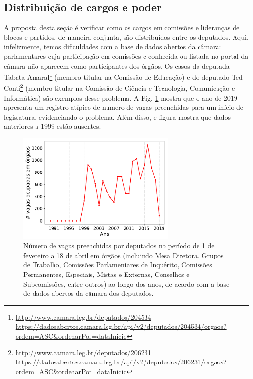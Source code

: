 \documentclass[12pt,a4paper]{article}
\newcommand{\footurl}[1]{{\scriptsize\url{#1}}}
\begin{document}
\subsection{Distribuição de cargos e poder}
\label{sec:cargos-deputados}

A proposta desta seção é verificar como os cargos em comissões e lideranças de blocos e partidos,
de maneira conjunta, são distribuídos entre os deputados. Aqui, infelizmente, temos dificuldades com a base de dados
abertos da câmara: parlamentares cuja participação em comissões é conhecida ou listada no portal
da câmara não aparecem como participantes dos órgãos. Os casos da deputada Tabata
Amaral\footnote{\footurl{http://www.camara.leg.br/deputados/204534}\\
  \footurl{https://dadosabertos.camara.leg.br/api/v2/deputados/204534/orgaos?ordem=ASC\&ordenarPor=dataInicio}}
(membro titular na Comissão de Educação) e do deputado
Ted Conti\footnote{\footurl{http://www.camara.leg.br/deputados/206231}\\
  \footurl{https://dadosabertos.camara.leg.br/api/v2/deputados/206231/orgaos?ordem=ASC\&ordenarPor=dataInicio}}
(membro titular na Comissão de Ciência e Tecnologia, Comunicação e Informática) são exemplos desse
problema. A Fig. \ref{fig:orgaos-por-ano} mostra que o ano de 2019 apresenta um registro atípico de número
de vagas preenchidas para um início de legislatura, evidenciando o problema. Além disso, e figura mostra que dados anteriores a 1999 estão
ausentes.

\begin{figure}[H]
\centering
\includegraphics[width=0.7\textwidth]{graficos/orgaos-ocupados-por-ano_2019-05-02.pdf}
\caption{Número de vagas preenchidas por deputados no período de 1 de fevereiro a 18 de abril em órgãos (incluindo Mesa Diretora,
  Grupos de Trabalho, Comissões Parlamentares de Inquérito, Comissões Permanentes, Especiais, Mistas e Externas,
  Conselhos e Subcomissões, entre outros) ao longo dos anos, de acordo com a base de dados abertos da câmara dos deputados.}
\label{fig:orgaos-por-ano}
\end{figure} 
\end{document}
